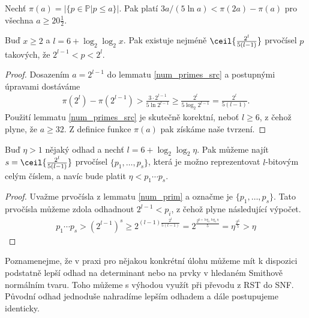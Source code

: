 \begin{lem} \label{num_primes_src}
Nechť $ \pi(a) = \left\vert \{ p \in \mathbb{P} \vert p \leq a \} \right\vert $. Pak
platí $ 3a / (5 \ln{a}) < \pi(2a) - \pi(a) $ pro všechna $ a \geq 20 \frac{1}{2} $.
\end{lem}

\begin{lem} \label{num_prim}
Buď $ x \geq 2 $ a $ l = 6 + \log_2 \log_2 x $.
Pak existuje nejméně $ \ceil{\frac{2^{l}}{5 (l - 1)}} $ prvočísel $ p $
takových, že $ 2^{l - 1} < p < 2^l $.
\end{lem}
\begin{proof}
Dosazením $ a = 2^{l - 1} $ do lemmatu \ref{num_primes_src} a postupnými úpravami
dostáváme
\begin{align*}
    \pi(2^{l}) - \pi(2^{l - 1}) > \frac{3 \cdot 2^{l - 1}}{5 \ln{2^{l - 1}}}
                                \geq \frac{2^{l}}{5 \log_2{2^{l - 1}}}
                                = \frac{2^{l}}{5 (l - 1)}.
\end{align*}
Použití lemmatu \ref{num_primes_src} je skutečně korektní, neboť
$ l \geq 6 $, z čehož plyne, že $ a \geq 32 $. Z definice funkce $ \pi(a) $ pak
získáme naše tvrzení.
\end{proof}

\begin{dus} \label{num_prim_dus}
Buď $ \eta > 1 $ nějaký odhad a nechť $ l = 6 + \log_2 \log_2 \eta $. 
Pak můžeme najít
$ s = \ceil{\frac{2^{l}}{5 (l - 1)}} $ prvočísel $ \{p_1, \dots, p_s\} $,
která je možno reprezentovat $ l $-bitovým celým číslem, a navíc bude platit
$ \eta < p_1 \cdots p_s $.
\end{dus}
\begin{proof}
Uvažme prvočísla z lemmatu \ref{num_prim} a označme je $ \{p_1, \dots, p_s\} $.
Tato prvočísla můžeme zdola odhadnout $ 2^{l - 1} < p_i $,
z čehož plyne následující výpočet.
\begin{align*}
    p_1 \cdots p_s
        > (2^{l - 1}) ^ s
        \geq 2^{(l - 1) \frac{2^l}{5 (l - 1)}}
        = 2^{\frac{2^{6 + \log_2 \log_2 \eta}}{5}}
        = \eta^{\frac{2^6}{5}} > \eta
\end{align*}
\end{proof}



\begin{pozn}
Poznamenejme, že v praxi pro nějakou konkrétní úlohu můžeme mít k dispozici
podstatně lepší odhad na determinant nebo na prvky v hledaném Smithově normálním
tvaru. Toho můžeme s výhodou využít při převodu z RST do SNF. Původní odhad
jednoduše nahradíme lepším odhadem a dále postupujeme identicky.
\end{pozn}


